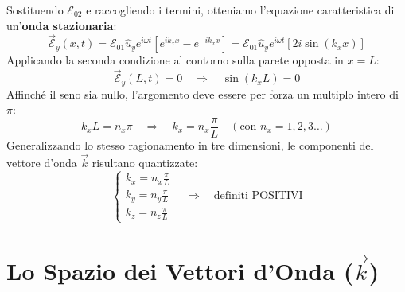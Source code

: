 \documentclass[11pt, a4paper]{article}
\begin{document}
\noindent
Sostituendo $\mathcal{E}_{02}$ e raccogliendo i termini, otteniamo l'equazione caratteristica di un'\textbf{onda stazionaria}: %
\begin{equation*}
    \vec{\mathcal{E}}_y(x,t) = \mathcal{E}_{01} \hat{u}_y e^{i\omega t} \left[ e^{ik_x x} - e^{-ik_x x} \right] = \mathcal{E}_{01} \hat{u}_y e^{i\omega t} [2i \sin(k_x x)]
\end{equation*}
Applicando la seconda condizione al contorno sulla parete opposta in $x=L$: %
\begin{equation*}
    \vec{\mathcal{E}}_y(L,t) = 0 \quad \Rightarrow \quad \sin(k_x L) = 0
\end{equation*}
Affinché il seno sia nullo, l'argomento deve essere per forza un multiplo intero di $\pi$: %
\begin{equation*}
    k_x L = n_x \pi \quad \Rightarrow \quad k_x = n_x \frac{\pi}{L} \quad (\text{con } n_x = 1, 2, 3 \dots)
\end{equation*}
Generalizzando lo stesso ragionamento in tre dimensioni, le componenti del vettore d'onda $\vec{k}$ risultano quantizzate: %
\begin{equation}
    \begin{cases}
        k_x = n_x \frac{\pi}{L} \\
        k_y = n_y \frac{\pi}{L} \\
        k_z = n_z \frac{\pi}{L}
    \end{cases} \quad \Rightarrow \quad \text{definiti POSITIVI}
\end{equation}

\section{Lo Spazio dei Vettori d'Onda ($\vec{k}$)} %
\end{document}

